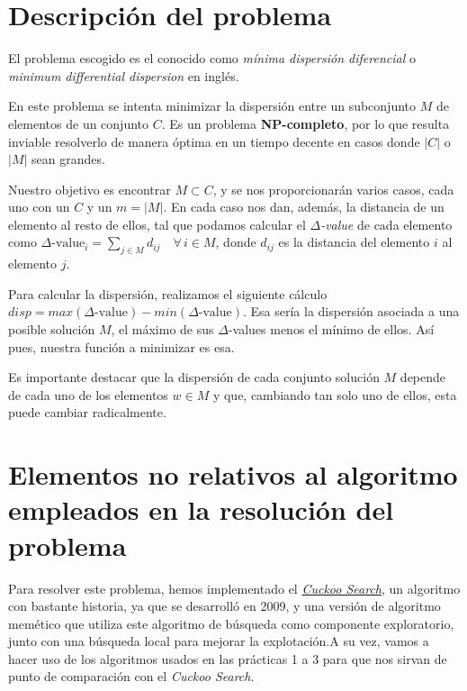 \newpage %

\tableofcontents %

\newpage

\section{Descripción del problema}

El problema escogido es el conocido como \textit{mínima dispersión diferencial} o \textit{minimum differential dispersion} en inglés.

En este problema se intenta minimizar la dispersión entre un subconjunto $M$ de elementos de un conjunto $C$. Es un problema \textbf{NP-completo}, por lo que resulta inviable resolverlo de manera óptima en un tiempo decente en casos donde $|C|$ o $|M|$ sean grandes.

Nuestro objetivo es encontrar $M \subset C$, y se nos proporcionarán varios casos, cada uno con un $C$ y un $m =|M|$.
En cada caso nos dan, además, la distancia de un elemento al resto de ellos, tal que podamos calcular el \textit{$\Delta$-value} de cada elemento como $\displaystyle \Delta \text{-value}_i = \sum_{j \in M}d_{ij}\quad \forall \, i \in M$, donde $d_{ij}$ es la distancia del elemento $i$ al elemento $j$.

Para calcular la dispersión, realizamos el siguiente cálculo $disp = max(\Delta\text{-value})-min(\Delta\text{-value})$. Esa sería la dispersión asociada a una posible solución $M$, el máximo de sus $\Delta$-values menos el mínimo de ellos. Así pues, nuestra función a minimizar es esa.

Es importante destacar que la dispersión de cada conjunto solución $M$ depende de cada uno de los elementos $w \in M$ y que, cambiando tan solo uno de ellos, esta puede cambiar radicalmente.

\section{Elementos no relativos al algoritmo empleados en la resolución del problema}
Para resolver este problema, hemos implementado el \href{https://en.wikipedia.org/wiki/Cuckoo_search}{\textit{Cuckoo Search}}, un algoritmo con bastante historia, ya que se desarrolló en 2009, y una versión de algoritmo memético que utiliza este algoritmo de búsqueda como componente exploratorio, junto con una búsqueda local para mejorar la explotación.A su vez, vamos a hacer uso de los algoritmos usados en las prácticas 1 a 3 para que nos sirvan de punto de comparación con el \textit{Cuckoo Search}.

